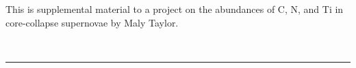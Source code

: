 \documentclass{article}
\newcounter{counter}
\newcounter{table_counter}
\begin{document}

This is supplemental material to a project on the abundances of C, N, and Ti in core-collapse supernovae by Maly Taylor.














\ \hrule
\end{document}
